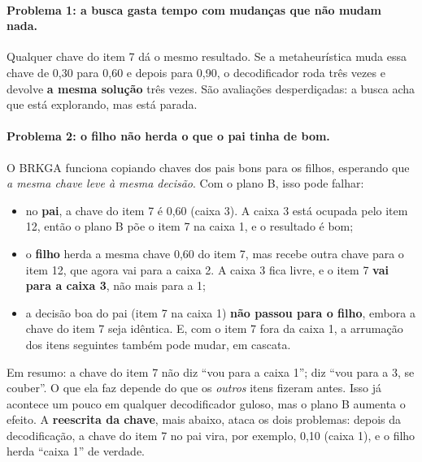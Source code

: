 \documentclass[11pt,a4paper]{article}
\begin{document}
\paragraph{Problema 1: a busca gasta tempo com mudanças que não mudam nada.} Qualquer chave do item 7 dá o mesmo
resultado. Se a metaheurística muda essa chave de 0,30 para 0,60 e depois para 0,90, o decodificador roda três vezes e
devolve \textbf{a mesma solução} três vezes. São avaliações desperdiçadas: a busca acha que está explorando, mas está
parada.

\paragraph{Problema 2: o filho não herda o que o pai tinha de bom.} O BRKGA funciona copiando chaves dos pais bons
para os filhos, esperando que \emph{a mesma chave leve à mesma decisão}. Com o plano B, isso pode falhar:
\begin{itemize}[leftmargin=*,itemsep=1pt]
\item no \textbf{pai}, a chave do item 7 é 0,60 (caixa 3). A caixa 3 está ocupada pelo item 12, então o plano B põe o
  item 7 na caixa 1, e o resultado é bom;
\item o \textbf{filho} herda a mesma chave 0,60 do item 7, mas recebe outra chave para o item 12, que agora vai para a
  caixa 2. A caixa 3 fica livre, e o item 7 \textbf{vai para a caixa 3}, não mais para a 1;
\item a decisão boa do pai (item 7 na caixa 1) \textbf{não passou para o filho}, embora a chave do item 7 seja
  idêntica. E, com o item 7 fora da caixa 1, a arrumação dos itens seguintes também pode mudar, em cascata.
\end{itemize}
Em resumo: a chave do item 7 não diz ``vou para a caixa 1''; diz ``vou para a 3, se couber''. O que ela faz depende do
que os \emph{outros} itens fizeram antes. Isso já acontece um pouco em qualquer decodificador guloso, mas o plano B
aumenta o efeito. A \textbf{reescrita da chave}, mais abaixo, ataca os dois problemas: depois da decodificação, a chave
do item 7 no pai vira, por exemplo, 0,10 (caixa 1), e o filho herda ``caixa 1'' de verdade.
\end{document}
